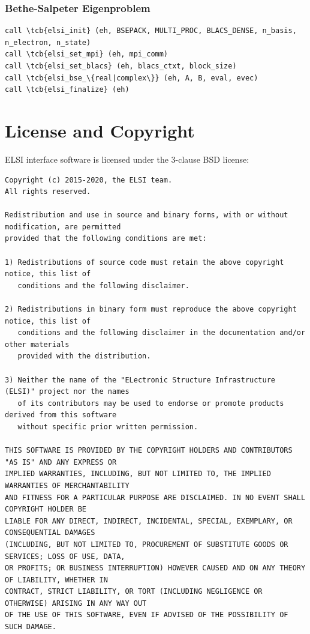\documentclass{report}
\newcommand{\tcb}[1]{\textcolor{blue}{#1}}
\begin{document}
\subsection*{Bethe-Salpeter Eigenproblem}
\begin{tcolorbox}
\begin{Verbatim}[commandchars=\\\{\}]
call \tcb{elsi_init} (eh, BSEPACK, MULTI_PROC, BLACS_DENSE, n_basis, n_electron, n_state)
call \tcb{elsi_set_mpi} (eh, mpi_comm)
call \tcb{elsi_set_blacs} (eh, blacs_ctxt, block_size)
call \tcb{elsi_bse_\{real|complex\}} (eh, A, B, eval, evec)
call \tcb{elsi_finalize} (eh)
\end{Verbatim}
\end{tcolorbox}




\chapter*{License and Copyright}
ELSI interface software is licensed under the 3-clause BSD license:

\begin{tcolorbox}
\begin{Verbatim}
Copyright (c) 2015-2020, the ELSI team.
All rights reserved.

Redistribution and use in source and binary forms, with or without modification, are permitted
provided that the following conditions are met:

1) Redistributions of source code must retain the above copyright notice, this list of
   conditions and the following disclaimer.

2) Redistributions in binary form must reproduce the above copyright notice, this list of
   conditions and the following disclaimer in the documentation and/or other materials
   provided with the distribution.

3) Neither the name of the "ELectronic Structure Infrastructure (ELSI)" project nor the names
   of its contributors may be used to endorse or promote products derived from this software
   without specific prior written permission.

THIS SOFTWARE IS PROVIDED BY THE COPYRIGHT HOLDERS AND CONTRIBUTORS "AS IS" AND ANY EXPRESS OR
IMPLIED WARRANTIES, INCLUDING, BUT NOT LIMITED TO, THE IMPLIED WARRANTIES OF MERCHANTABILITY
AND FITNESS FOR A PARTICULAR PURPOSE ARE DISCLAIMED. IN NO EVENT SHALL COPYRIGHT HOLDER BE
LIABLE FOR ANY DIRECT, INDIRECT, INCIDENTAL, SPECIAL, EXEMPLARY, OR CONSEQUENTIAL DAMAGES
(INCLUDING, BUT NOT LIMITED TO, PROCUREMENT OF SUBSTITUTE GOODS OR SERVICES; LOSS OF USE, DATA,
OR PROFITS; OR BUSINESS INTERRUPTION) HOWEVER CAUSED AND ON ANY THEORY OF LIABILITY, WHETHER IN
CONTRACT, STRICT LIABILITY, OR TORT (INCLUDING NEGLIGENCE OR OTHERWISE) ARISING IN ANY WAY OUT
OF THE USE OF THIS SOFTWARE, EVEN IF ADVISED OF THE POSSIBILITY OF SUCH DAMAGE.
\end{Verbatim}
\end{tcolorbox}
\end{document}
